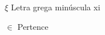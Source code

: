
\begin{simbolos}
  \item[$ \xi $] Letra grega minúscula xi
  \item[$ \in $] Pertence
\end{simbolos}
